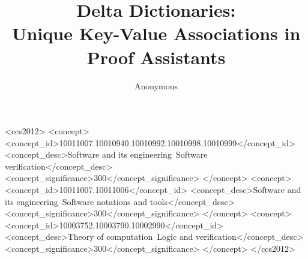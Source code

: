 \documentclass[sigplan,10pt,review]{acmart}
\begin{document}
\title
  [Delta Dictionaries] %
  {Delta Dictionaries:\\Unique Key-Value Associations in Proof Assistants}

\author{Anonymous}




\begin{CCSXML}
<ccs2012>
   <concept>
       <concept_id>10011007.10010940.10010992.10010998.10010999</concept_id>
       <concept_desc>Software and its engineering~Software verification</concept_desc>
       <concept_significance>300</concept_significance>
       </concept>
   <concept>
       <concept_id>10011007.10011006</concept_id>
       <concept_desc>Software and its engineering~Software notations and
tools</concept_desc>
       <concept_significance>300</concept_significance>
       </concept>
   <concept>
       <concept_id>10003752.10003790.10002990</concept_id>
       <concept_desc>Theory of computation~Logic and verification</concept_desc>
       <concept_significance>300</concept_significance>
       </concept>
 </ccs2012>
\end{CCSXML}



\maketitle










\end{document}
